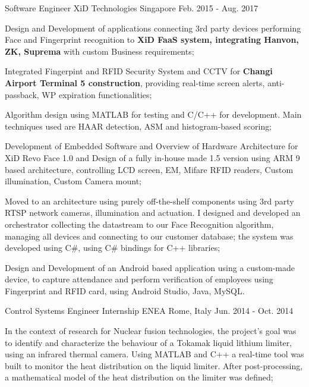 \begin{cventries}
    \cventry
    {Software Engineer} %
    {XiD Technologies} %
    {Singapore} %
    {Feb. 2015 - Aug. 2017} %
    {
      \begin{cvitems} %
        \item {Design and Development of applications connecting 3rd party devices performing Face and Fingerprint recognition to
        \textbf{XiD FaaS system, integrating Hanvon, ZK, Suprema} with custom Business requirements;}
        \item {Integrated Fingerpint and RFID Security System and CCTV for \textbf{Changi Airport Terminal 5 construction}, providing
        real-time screen alerts, anti-passback, WP expiration functionalities;}
        \item {Algorithm design using MATLAB for testing and C/C++ for development.
        Main techniques used are HAAR detection, ASM and
        histogram-based scoring;}
        \item {Development of Embedded Software and Overview of Hardware Architecture for XiD Revo Face 1.0 and Design of a fully
        in-house made 1.5 version using ARM 9 based architecture, controlling LCD screen, EM, Mifare RFID readers, Custom illumination,
        Custom Camera mount;}
        \item {Moved to an architecture using purely off-the-shelf components using 3rd party RTSP network cameras, illumination and actuation.
        I designed and developed an orchestrator collecting the datastream to our Face Recognition algorithm, managing all devices and connecting to our customer database;
        the system was developed using C\#, using C\# bindings for C++ libraries;}
        \item {Design and Development of an Android based application using a custom-made device, to capture attendance and
        perform verification of employees using Fingerprint and RFID card, using Android Studio, Java, MySQL.}
      \end{cvitems}
    }

    \cventry
    {Control Systems Engineer Internship} %
    {ENEA} %
    {Rome, Italy} %
    {Jun. 2014 - Oct. 2014} %
    {
      \begin{cvitems} %
        \item {In the context of research for Nuclear fusion technologies, the project’s
        goal was to identify and characterize the behaviour
        of a Tokamak liquid lithium limiter, using an infrared thermal
        camera. Using MATLAB and C++ a real-time tool was built to monitor
        the heat distribution on the liquid limiter. After post-processing, a
        mathematical model of the heat distribution on the limiter was defined;}
      \end{cvitems}
    }


\end{cventries}
